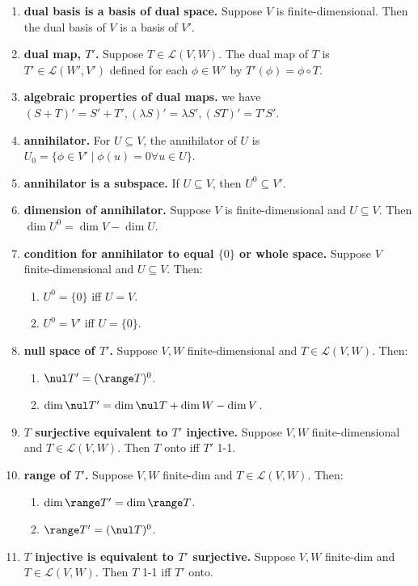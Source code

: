 \begin{enumerate}
	\item \textbf{dual basis is a basis of dual space. } Suppose $V$ is finite-dimensional. Then the dual basis of $V$ is a basis of $V'$. 
	\item \textbf{dual map, $T'$. } Suppose $T \in \mathscr{L}(V,W)$. The dual map of $T$ is $T' \in \mathscr{L}(W', V')$ defined for each $\phi \in W'$ by $T'(\phi) = \phi \circ T$. 
	\item \textbf{algebraic properties of dual maps. } we have $(S + T)' = S' + T', (\lambda S)' = \lambda S', (ST)' = T'S'$. 
	\item \textbf{annihilator. } For $U \subseteq V$, the annihilator of $U$ is $U_0 = \{\phi \in V' \mid \phi(u) = 0 \forall u \in U\}$. 
	\item \textbf{annihilator is a subspace. } If $U \subseteq V$, then $U^0 \subseteq V'$. 
	\item \textbf{dimension of annihilator. } Suppose $V$ is finite-dimensional and $U \subseteq V$. Then $\dim U^0 = \dim V - \dim U$. 
	\item \textbf{condition for annihilator to equal $\{0\}$ or whole space. } Suppose $V$ finite-dimensional and $U \subseteq V$. Then: 
	\begin{enumerate}
		\item $U^0 = \{0\}$ iff $U=V$. 
		\item $U^0 = V'$ iff $U = \{0\}$. 
	\end{enumerate}
	\item \textbf{null space of $T'$. } Suppose $V,W$ finite-dimensional and $T \in \mathscr{L}(V,W)$. Then: 
	\begin{enumerate}
		\item $\nul T' = (\range T)^0$. 
		\item $\dim \nul T' = \dim \nul T + \dim W - \dim V$. 
	\end{enumerate}
	\item \textbf{$T$ surjective equivalent to $T'$ injective. } Suppose $V,W$ finite-dimensional and $T \in \mathscr{L}(V,W)$. Then $T$ onto iff $T'$ 1-1. 
	\item \textbf{range of $T'$. } Suppose $V,W$ finite-dim and $T \in \mathscr{L}(V,W)$. Then: 
	\begin{enumerate}
		\item $\dim \range T' = \dim \range T$. 
		\item $\range T' = (\nul T)^0$. 
	\end{enumerate}
	\item \textbf{$T$ injective is equivalent to $T'$ surjective. } Suppose $V,W$ finite-dim and $T \in \mathscr{L}(V,W)$. Then $T$ 1-1 iff $T'$ onto. 

\end{enumerate}
